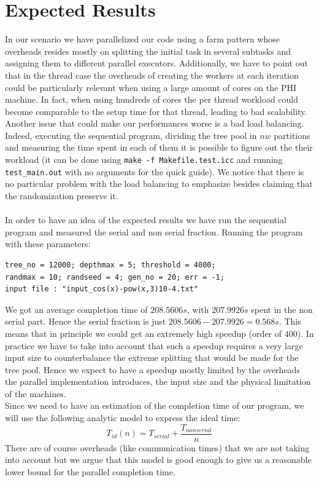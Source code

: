\documentclass[10pt]{article}
\numberwithin{equation}{section}
\begin{document}
\section{Expected Results}
In our scenario we have parallelized our code using a farm pattern whose overheads resides mostly on splitting the initial task in several subtasks and assigning them to different parallel executors. Additionally, we have to point out that in the thread case the overheads of creating the workers at each iteration could be particularly relevant when using a large amount of cores on the PHI machine. In fact, when using hundreds of cores the per thread workload could become comparable to the setup time for that thread, leading to bad scalability.\\
Another issue that could make our performances worse is a bad load balancing. Indeed, executing the sequential program, dividing the tree pool in $nw$ partitions and measuring the time spent in each of them it is possible to figure out the their workload (it can be done using \verb|make -f Makefile.test.icc| and running \verb|test_main.out| with no arguments for the quick guide). We notice that there is no particular problem with the load balancing to emphasize besides claiming that the randomization preserve it.\\
\\ 
In order to have an idea of the expected results we have run the sequential program and measured the serial and non serial fraction. Running the program with these parameters:
\begin{verbatim}
tree_no = 12000; depthmax = 5; threshold = 4000;
randmax = 10; randseed = 4; gen_no = 20; err = -1;
input file : "input_cos(x)-pow(x,3)10-4.txt"
\end{verbatim} 
We got an average completion time of $208.5606s$, with $207.9926s$ spent in the non serial part. Hence the serial fraction is just $208.5606 - 207.9926 = 0.568s$. This means that in principle we could get an extremely high speedup (order of $400$). In practice we have to take into account that such a speedup requires a very large input size to counterbalance the extreme splitting that would be made for the tree pool. Hence we expect to have a speedup mostly limited by the overheads the parallel implementation introduces, the input size and the physical limitation of the machines.\\
Since we need to have an estimation of the completion time of our program, we will use the following analytic model to express the ideal time:
\begin{equation}
T_{id}(n) = T_{serial} + \frac{T_{nonserial}}{n}
\end{equation}
There are of course overheads (like communication times) that we are not taking into account but we argue that this model is good enough to give us a reasonable lower bound for the parallel completion time.
\end{document}
